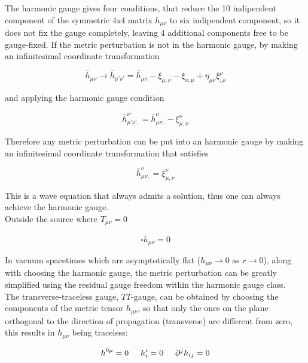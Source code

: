 \documentclass[binding=0.6cm, LaM]{sapthesis}
\begin{document}
	The harmonic gauge gives four conditions, that reduce the 10 indipendent component of the symmetric 4x4 matrix 
	$h_{\mu\nu}$ to six indipendent component, so it does not fix the gauge completely,
	leaving 4 additional components free to be gauge-fixed.
	If the metric perturbation is not in the harmonic gauge, by making an infinitesimal coordinate transformation

		\begin{equation}
		{\bar h}_{\mu\nu} \rightarrow {\bar h}_{\mu’\nu’}  = {\bar h}_{\mu\nu}  - \xi_{\mu,\nu} -\xi_{\nu,\mu} + \eta_{\mu\nu}\xi^{\rho}_{,\rho}
		\end{equation}

	and applying the harmonic gauge condition

		\begin{equation}
		{\bar h}_{\mu’\nu’,} ^{\nu’} = {\bar h}_{\mu\nu,} ^{\nu} - \xi_{\mu,\nu}^{\nu}
		\end{equation}

	Therefore any metric perturbation can be put into an harmonic gauge by making an infinitesimal 
	coordinate transformation that satisfies

		\begin{equation}
		{\bar h}_{\mu\nu,} ^{\nu} = \xi_{\mu,\nu}^{\nu}
		\end{equation}

	This is a wave equation that always admits a solution, thus one can always achieve the harmonic gauge. \\
	Outside the source where $T_{\mu\nu} = 0$

		\begin{equation}
		\square {\bar h}_{\mu\nu} = 0
		\end{equation}

	In vacuum spacetimes which are asymptotically flat ($h_{\mu\nu} \rightarrow 0$ as $r \rightarrow 0$), 
	along with choosing the harmonic gauge, the metric perturbation can be greatly simplified using
	the residual gauge freedom within the harmonic gauge class. \\
	The transverse-traceless gauge, $TT$-gauge, can be obtained by choosing the components of the metric tensor $h_{\mu\nu}$,
	so that only the ones on the plane orthogonal to the direction of propagation (transverse) 
	are different from zero, this results in $h_{\mu\nu}$ being traceless:

		\begin{equation}
		h^{0\mu} = 0 \hspace*{0.5cm}  h^{i}_i = 0  \hspace*{0.5cm}   {\partial}^jh_{ij} = 0
		\end{equation}
\end{document}
